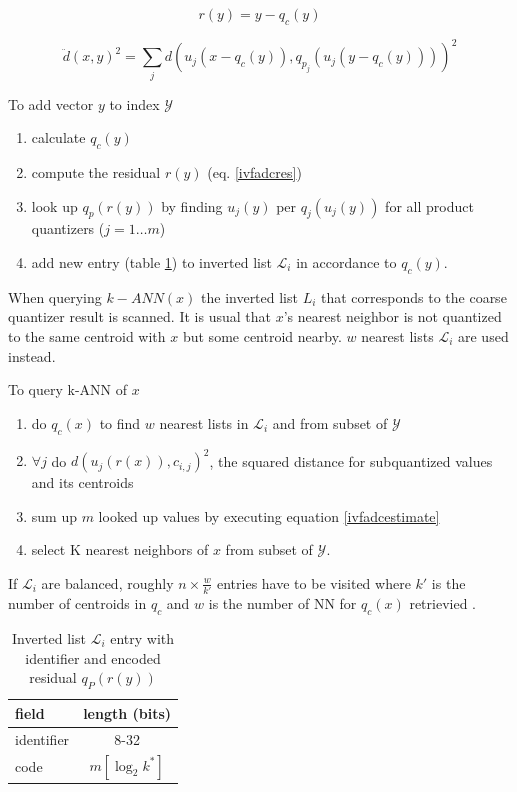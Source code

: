 \documentclass[english,12pt,a4paper,pdftex,elec,utf8]{aaltothesis}
\begin{document}
\begin{equation}
  \label{ivfadcres}
r(y) = y - q_c(y)
\end{equation}

\begin{equation}
  \label{ivfadcestimate}
  \ddot{d}(x,y)^2 = \sum_jd\left(u_j(x-q_c(y)), q_{p_j}(u_j(y-q_c(y)))\right)^2
\end{equation}

To add vector $y$ to index $\mathcal{Y}$
\begin{enumerate}
\item calculate $q_c(y)$
\item compute the residual $r(y)$ (eq. \ref{ivfadcres})
\item look up $q_p(r(y))$ by finding $u_j(y)$ per $q_j(u_j(y))$ for all product quantizers ($j = 1 \ldots m$)
\item add new entry (table \ref{ivfadcentry}) to inverted list $\mathcal{L}_i$ in accordance to $q_c(y)$.
\end{enumerate}

When querying $k-ANN(x)$ the inverted list $L_i$ that corresponds to the coarse quantizer result is scanned. It is usual that $x$'s nearest neighbor is not quantized to the same centroid with $x$ but some centroid nearby. $w$ nearest lists $\mathcal{L}_i$ are used instead. \cite{Jegou2008}


To query k-ANN of $x$
\begin{enumerate}
\item do $q_c(x)$ to find $w$ nearest lists in $\mathcal{L}_i$ and from subset of $\mathcal{Y}$
\item $\forall j$ do $d(u_j(r(x)), c_{i,j})^2$, the squared distance for subquantized values and its centroids
\item sum up $m$ looked up values by executing equation \ref{ivfadcestimate}
  \item select K nearest neighbors of $x$ from subset of $\mathcal{Y}$.
\end{enumerate}
\cite{Jegou2008}

If $\mathcal{L}_i$ are balanced, roughly $n \times \frac{w}{k'}$ entries have to be visited where $k'$ is the number of centroids in $q_c$ and $w$ is the number of NN for $q_c(x)$ retrievied \cite{Jegou2008}.

\def\arraystretch{1.5}
\begin{table}[htb]
\caption{Inverted list $\mathcal{L}_i$ entry with identifier and encoded residual $q_P(r(y))$ \cite{Jegou2008}}
\label{ivfadcentry}
\begin{center}
\begin{tabular}{lc}
  field & length (bits)\\
  \hline
  identifier&8-32\\
  code & $m[\log_2k^*]$\\
\end{tabular}
\end{center}\end{table}
\end{document}
